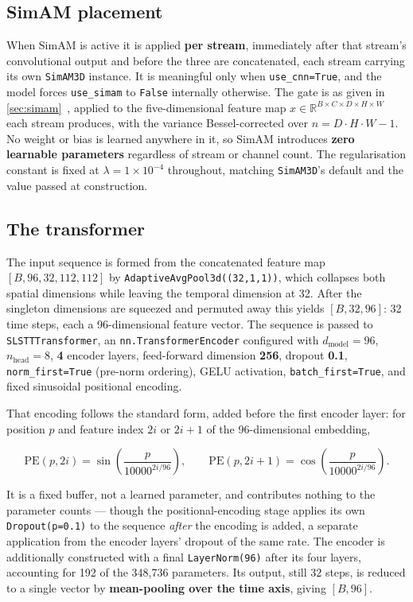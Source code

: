 \subsection{SimAM placement}
\label{sec:simam-placement}

When SimAM is active it is applied \textbf{per stream}, immediately after that stream's convolutional output and before the three are concatenated, each stream carrying its own \texttt{SimAM3D} instance. It is meaningful only when \texttt{use\_cnn=True}, and the model forces \texttt{use\_simam} to \texttt{False} internally otherwise. The gate is as given in \autoref{sec:simam}~\cite{yang2021}, applied to the five-dimensional feature map $x \in \mathbb{R}^{B \times C \times D \times H \times W}$ each stream produces, with the variance Bessel-corrected over $n = D \cdot H \cdot W - 1$. No weight or bias is learned anywhere in it, so SimAM introduces \textbf{zero learnable parameters} regardless of stream or channel count. The regularisation constant is fixed at $\lambda = 1 \times 10^{-4}$ throughout, matching \texttt{SimAM3D}'s default and the value passed at construction.

\subsection{The transformer}
\label{sec:transformer-config}

The input sequence is formed from the concatenated feature map $[B,96,32,112,112]$ by \texttt{AdaptiveAvgPool3d((32,1,1))}, which collapses both spatial dimensions while leaving the temporal dimension at 32. After the singleton dimensions are squeezed and permuted away this yields $[B,32,96]$: 32 time steps, each a 96-dimensional feature vector. The sequence is passed to \texttt{SLSTTTransformer}, an \texttt{nn.TransformerEncoder} configured with $d_{\text{model}} = 96$, $n_{\text{head}} = 8$, \textbf{4} encoder layers, feed-forward dimension \textbf{256}, dropout \textbf{0.1}, \texttt{norm\_first=True} (pre-norm ordering), GELU activation, \texttt{batch\_first=True}, and fixed sinusoidal positional encoding.

That encoding follows the standard form, added before the first encoder layer: for position $p$ and feature index $2i$ or $2i+1$ of the 96-dimensional embedding,

\[
	\mathrm{PE}(p, 2i) = \sin\!\left(\frac{p}{10000^{2i/96}}\right), \qquad \mathrm{PE}(p, 2i+1) = \cos\!\left(\frac{p}{10000^{2i/96}}\right).
\]

It is a fixed buffer, not a learned parameter, and contributes nothing to the parameter counts --- though the positional-encoding stage applies its own \texttt{Dropout(p=0.1)} to the sequence \textit{after} the encoding is added, a separate application from the encoder layers' dropout of the same rate. The encoder is additionally constructed with a final \texttt{LayerNorm(96)} after its four layers, accounting for 192 of the 348,736 parameters. Its output, still 32 steps, is reduced to a single vector by \textbf{mean-pooling over the time axis}, giving $[B,96]$.

